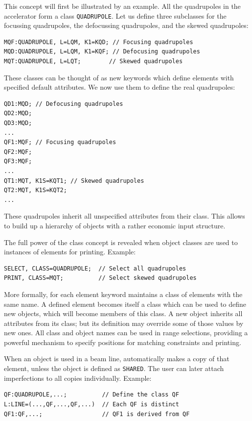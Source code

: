 This concept will first be illustrated by an example.
All the quadrupoles in the accelerator form a class \texttt{QUADRUPOLE}.
Let us define three subclasses for the focussing quadrupoles,
the defocussing quadrupoles, and the skewed quadrupoles:
\begin{verbatim}
MQF:QUADRUPOLE, L=LQM, K1=KQD; // Focusing quadrupoles
MQD:QUADRUPOLE, L=LQM, K1=KQF; // Defocusing quadrupoles
MQT:QUADRUPOLE, L=LQT;        // Skewed quadrupoles
\end{verbatim}
These classes can be thought of as new keywords which define elements
with specified default attributes. 
We now use them to define the real quadrupoles:
\begin{verbatim}
QD1:MQD; // Defocusing quadrupoles
QD2:MQD;
QD3:MQD;
...
QF1:MQF; // Focusing quadrupoles
QF2:MQF;
QF3:MQF;
...
QT1:MQT, K1S=KQT1; // Skewed quadrupoles
QT2:MQT, K1S=KQT2;
...
\end{verbatim}
These quadrupoles inherit all unspecified attributes from their class.
This allows to build up a hierarchy of objects with a rather
economic input structure.

The full power of the class concept is revealed when object classes
are used to  instances of elements for printing.
\noindent Example:
\begin{verbatim}
SELECT, CLASS=QUADRUPOLE;  // Select all quadrupoles
PRINT, CLASS=MQT;          // Select skewed quadrupoles
\end{verbatim}

More formally, for each element keyword \opal maintains a class of
elements with the same name. 
A defined element becomes itself a class which can be used to define
new objects, 
which will become members of this class.
A new object inherits all attributes from its class;
but its definition may override some of those values by new ones.
All class and object names can be used in range selections,
providing a powerful mechanism to specify positions
for matching constraints and printing.

When an object is used in a beam line,
\opal automatically makes a copy of that element,
unless the object is defined as \texttt{SHARED}.
The user can later attach imperfections to all copies individually.
Example:
\begin{verbatim}
QF:QUADRUPOLE,...;          // Define the class QF
L:LINE=(...,QF,...,QF,...)  // Each QF is distinct
QF1:QF,...;                 // QF1 is derived from QF
\end{verbatim}

